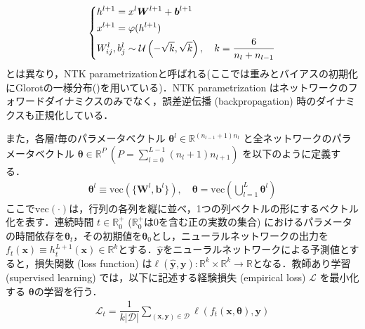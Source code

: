 \documentclass[a4paper]{bxjsarticle}
\theoremstyle{definition}
\begin{document}
\begin{align}
    \begin{dcases}
        h^{l+1} = x^{l}\bm{W}^{l+1} + \bm{b}^{l+1} \\
        x^{l+1} = \varphi(h^{l+1}) \\
        W_{ij}^{l}, b_{j}^{l} \sim \mathcal{U}\left(-\sqrt{k}, \sqrt{k}\right), \quad k = \dfrac{6}{n_l + n_{l-1}}
    \end{dcases}
\end{align}
とは異なり，NTK parametrizationと呼ばれる(ここでは重みとバイアスの初期化にGlorotの一様分布(\citealp{glorot2010understanding})を用いている)．NTK parametrization はネットワークのフォワードダイナミクスのみでなく，誤差逆伝播 (backpropagation) 時のダイナミクスも正規化している．

また，各層$l$毎のパラメータベクトル $\bm{\theta}^l \in \mathbb{R}^{(n_{l-1}+1)n_l}$ と全ネットワークのパラメータベクトル $\bm{\theta} \in \mathbb{R}^P \ (P=\sum_{l=0}^{L-1}(n_{l}+1)n_{l+1})$ を以下のように定義する．
\begin{align}
    \bm{\theta}^{l} \equiv \mbox{vec}\left(\{\bm{W}^{l}, \bm{b}^{l}\}\right), \quad \bm{\theta} = \mbox{vec}\left(\bigcup_{l=1}^L \bm{\theta}^l\right)
\end{align}
ここで$\mbox{vec}(\cdot)$は，行列の各列を縦に並べ，1つの列ベクトルの形にするベクトル化を表す．連続時間 $t \in \mathbb{R}_0^{+}$ ($\mathbb{R}_0^{+}$は0を含む正の実数の集合)  におけるパラメータの時間依存を$\bm{\theta}_t$，その初期値を$\bm{\theta}_0$とし，ニューラルネットワークの出力を$f_t(\bm{x}) \equiv h_t^{L+1}(\bm{x}) \in \mathbb{R}^{k}$とする．$\hat{\bm{y}}$をニューラルネットワークによる予測値とすると，損失関数 (loss function) は$\ell (\hat{\bm{y}}, \bm{y}):\mathbb{R}^{k} \times \mathbb{R}^k \rightarrow \mathbb{R}$となる．教師あり学習 (supervised learning) では，以下に記述する経験損失 (empirical loss) $\mathcal{L}$ を最小化する $\bm{\theta}$の学習を行う．
\begin{align}
    \mathcal{L}_t = \dfrac{1}{k|\mathcal{D}|}\sum_{(\bm{x},\bm{y}) \in \mathcal{D}} \ell(f_t(\bm{x},\bm{\theta}), \bm{y})
\end{align}
\end{document}
